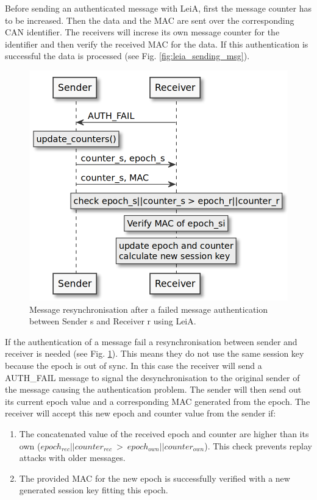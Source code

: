 Before sending an authenticated message with LeiA, first the message counter has to be increased. Then the data and the MAC are sent over the corresponding CAN identifier. The receivers will increse its own message counter for the identifier and then verify the received MAC for the data. If this authentication is successful the data is processed (see Fig. \ref{fig:leia_sending_msg}).

\begin{figure}[h]
    \centering
    \captionsetup{justification=centering}
	\includegraphics[width=1\linewidth]{Figures/LeiA_resync.png}
	\caption[]{Message resynchronisation after a failed message authentication between Sender s and Receiver r using LeiA.}
	\label{fig:leia_resync}
\end{figure}

If the authentication of a message fail a resynchronisation between sender and receiver is needed (see Fig. \ref{fig:leia_resync}). This means they do not use the same session key because the epoch is out of sync. In this case the receiver will send a AUTH\_FAIL message to signal the desynchronisation to the original sender of the message causing the authentication problem. The sender will then send out its current epoch value and a corresponding MAC generated from the epoch. The receiver will accept this new epoch and counter value from the sender if:

\begin{enumerate}
    \item The concatenated value of the received epoch and counter are higher than its own ($ epoch_{rec} || counter_{rec}~>~epoch_{own} || counter_{own} $). This check prevents replay attacks with older messages. 
    \item The provided MAC for the new epoch is successfully verified with a new generated session key fitting this epoch.
\end{enumerate}

